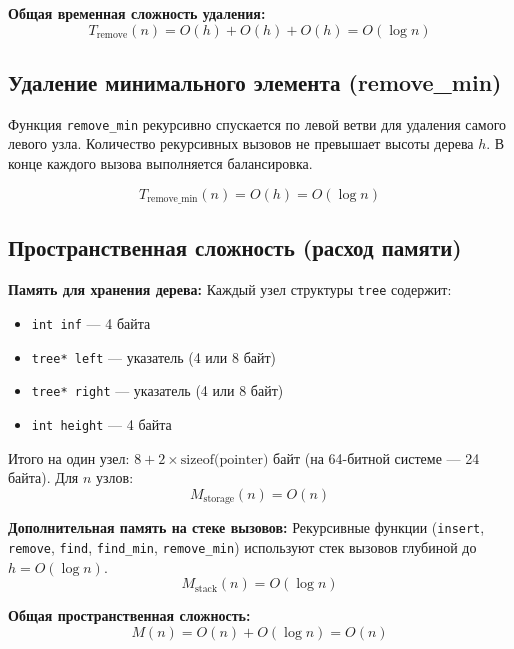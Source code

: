\documentclass[otchet]{SCWorks}
\begin{document}
\textbf{Общая временная сложность удаления:}
\[
T_{\text{remove}}(n) = O(h) + O(h) + O(h) = O(\log n)
\]

\subsection*{Удаление минимального элемента (remove\_min)}

Функция \texttt{remove\_min} рекурсивно спускается по левой ветви для удаления самого левого узла. Количество рекурсивных вызовов не превышает высоты дерева \(h\). В конце каждого вызова выполняется балансировка.

\[
T_{\text{remove\_min}}(n) = O(h) = O(\log n)
\]

\subsection*{Пространственная сложность (расход памяти)}

\textbf{Память для хранения дерева:}
Каждый узел структуры \texttt{tree} содержит:
\begin{itemize}
    \item \texttt{int inf} — 4 байта
    \item \texttt{tree* left} — указатель (4 или 8 байт)
    \item \texttt{tree* right} — указатель (4 или 8 байт)
    \item \texttt{int height} — 4 байта
\end{itemize}
Итого на один узел: \(8 + 2 \times \text{sizeof(pointer)}\) байт (на 64-битной системе — 24 байта). Для \(n\) узлов:
\[
M_{\text{storage}}(n) = O(n)
\]

\textbf{Дополнительная память на стеке вызовов:}
Рекурсивные функции (\texttt{insert}, \texttt{remove}, \texttt{find}, \texttt{find\_min}, \texttt{remove\_min}) используют стек вызовов глубиной до \(h = O(\log n)\).
\[
M_{\text{stack}}(n) = O(\log n)
\]

\textbf{Общая пространственная сложность:}
\[
M(n) = O(n) + O(\log n) = O(n)
\]
\end{document}
